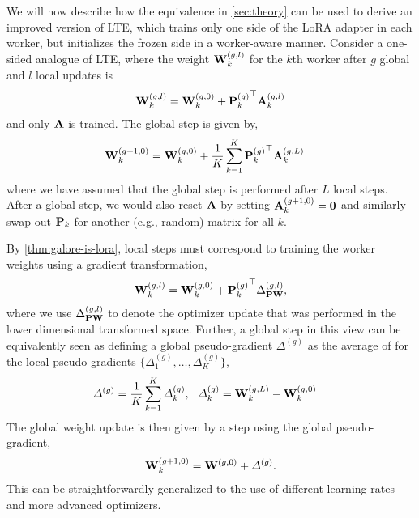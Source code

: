  We will now describe how the equivalence in \cref{sec:theory} can be used to derive an improved version of LTE, which trains only one side of the LoRA adapter in each worker, but initializes the frozen side in a worker-aware manner.
Consider a one-sided analogue of LTE, where the weight ${\mathbf{W}}^{(g, l)}_k$ for the $k$th worker after $g$ global and $l$ local updates is
\setlength{\abovedisplayskip}{3pt}
\setlength{\belowdisplayskip}{3pt}
\begin{align*}
    {\mathbf{W}}^{(g, l)}_k = {\mathbf{W}}^{(g, 0)}_k + {{\mathbf{P}}^{(g)}_k}^\top {\mathbf{A}}^{(g, l)}_k
\end{align*}
and only ${\mathbf{A}}$ is trained. The global step is given by,
\begin{align*}
    {\mathbf{W}}^{(g + 1, 0)}_k 
    &= {\mathbf{W}}^{(g, 0)}_k + \frac{1}{K} \sum_{k = 1}^K {{\mathbf{P}}^{(g)}_k}^\top {\mathbf{A}}^{(g, L)}_k
\end{align*}
where we have assumed that the global step is performed after $L$ local steps.
After a global step, we would also reset ${\mathbf{A}}$ by setting ${\mathbf{A}}_k^{(g + 1, 0)} = {\mathbf{0}}$ and similarly swap out ${\mathbf{P}}_k$ for another (e.g., random) matrix for all $k$.

By \cref{thm:galore-is-lora}, local steps must correspond to training the worker weights using a gradient transformation, 
\begin{align*}
    {\mathbf{W}}^{(g, l)}_k = {\mathbf{W}}^{(g, 0)}_k + {{\mathbf{P}}^{(g)}_k}^\top \Delta_{{\mathbf{P}} {\mathbf{W}}}^{(g, l)},
\end{align*}
where we use $\Delta_{{\mathbf{P}} {\mathbf{W}}}^{(g, l)}$ to denote the optimizer update that was performed in the lower dimensional transformed space.
Further, a global step in this view can be equivalently seen as defining a global pseudo-gradient $\varDelta^{(g)}$ as the average of for the local pseudo-gradients $\{\varDelta^{(g)}_1, \ldots, \varDelta^{(g)}_K\}$,
\begin{align*}
    \varDelta^{(g)} &= \frac{1}{K} \sum_{k = 1}^K \varDelta_k^{(g)}, \,\,\,\,
    \varDelta_k^{(g)} = {\mathbf{W}}^{(g, L)}_k - {\mathbf{W}}^{(g, 0)}_k 
\end{align*}
The global weight update is then given by a step using the global pseudo-gradient,
\begin{align*}
    {\mathbf{W}}^{(g + 1, 0)}_k = {\mathbf{W}}^{(g, 0)} + \varDelta^{(g)}.
\end{align*}
This can be straightforwardly generalized to the use of different learning rates and more advanced optimizers.

\setlength{\abovedisplayskip}{\baselineskip}
\setlength{\belowdisplayskip}{\baselineskip}



